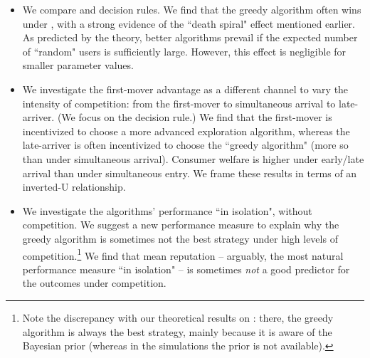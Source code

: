 \begin{itemize}
\item We compare \HardMax and \HardMaxRandom decision rules. We find that the greedy algorithm often wins under \HardMax, with a strong evidence of the ``death spiral" effect mentioned earlier.
 As predicted by the theory, better algorithms prevail if the expected number of ``random" users is sufficiently large. However, this effect is negligible for smaller parameter values.


\item We investigate the first-mover advantage as a different channel to vary the intensity of competition: from the first-mover to simultaneous arrival to late-arriver. (We focus on the \HardMax decision rule.) We find that the first-mover is incentivized to choose a more advanced exploration algorithm, whereas the late-arriver is often incentivized to choose the ``greedy algorithm" (more so than under simultaneous arrival). Consumer welfare is higher under early/late arrival than under simultaneous entry. We frame these results in terms of an inverted-U relationship.



\item We investigate the algorithms' performance ``in isolation", \ie without competition. We suggest a new performance measure to explain why the greedy algorithm is sometimes not the best strategy under high levels of competition.\footnote{Note the discrepancy with our theoretical results on \HardMax: there, the greedy algorithm is always the best strategy, mainly because it is aware of the Bayesian prior (whereas in the simulations the prior is not available).}
     We find that mean reputation -- arguably, the most natural performance measure ``in isolation" -- is sometimes \emph{not} a good predictor for the outcomes under competition.


\end{itemize}
